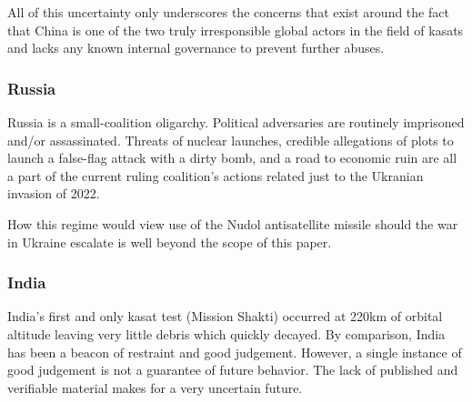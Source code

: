 All of this uncertainty only underscores the concerns that exist
around the fact that China is one of the two truly irresponsible
global actors in the field of \acp{kasat} and lacks any known internal
governance to prevent further abuses.


\subsubsection{Russia}

Russia is a small-coalition oligarchy.\cite[russian-gov-primer]{xxx}
Political adversaries are routinely imprisoned and/or
assassinated.\cite{navalny}\cite{polonium} Threats of nuclear
launches, credible allegations of plots to launch a false-flag attack
with a dirty bomb, and a road to economic ruin are all a part of the
current ruling coalition's actions related just to the Ukranian
invasion of
2022.\cite{false-flag}\cite{russian-economy}\cite{putin-compensating}

How this regime would view use of the Nudol antisatellite missile
should the war in Ukraine escalate is well beyond the scope of this
paper.

\subsubsection{India}
India's first and only \ac{kasat} test (Mission Shakti) occurred at
220km of orbital altitude leaving very little debris which quickly
decayed.\cite[p05-01]{brian} By comparison, India has been a beacon of
restraint and good judgement.  However, a single instance of good
judgement is not a guarantee of future behavior.  The lack of
published and verifiable material makes for a very uncertain future.
